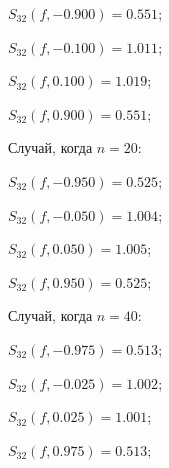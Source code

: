 \documentclass[11pt, russian]{article}
\begin{document}
    
    $S_{32}(f,-0.900)=0.551$;

    
    $S_{32}(f,-0.100)=1.011$;

    
    $S_{32}(f,0.100)=1.019$;

    
    $S_{32}(f,0.900)=0.551$;

    
    

    
    Случай, когда $n=20$:

    
    

    
    $S_{32}(f,-0.950)=0.525$;

    
    $S_{32}(f,-0.050)=1.004$;

    
    $S_{32}(f,0.050)=1.005$;

    
    $S_{32}(f,0.950)=0.525$;

    
    

    
    Случай, когда $n=40$:

    
    

    
    $S_{32}(f,-0.975)=0.513$;

    
    $S_{32}(f,-0.025)=1.002$;

    
    $S_{32}(f,0.025)=1.001$;

    
    $S_{32}(f,0.975)=0.513$;

    
    

    

    
    
    
\end{document}
